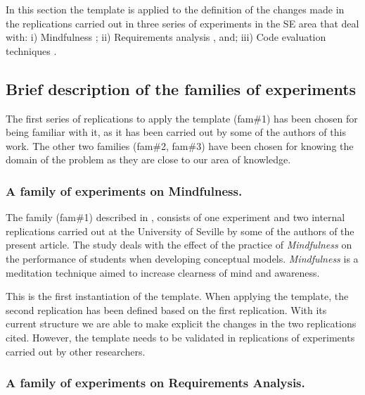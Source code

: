 % 
%
%
In this section the template is applied to the definition of the changes made in the replications carried out in three series of experiments in the SE area that deal with: i) Mindfulness \cite{bernardez-jss-2016}; ii) Requirements analysis \cite{aranda2016estudio}, and; iii) Code evaluation techniques \cite{juristo2012comparing,juristo2003functional,juristo2013process}.

%
%
\subsection{Brief description of the families of experiments}
\label{sec:brief}
The first series of replications to apply the template (fam\#1) has been chosen for being familiar with it, as it has been carried out by some of the authors of this work. The other two families (fam\#2, fam\#3) have been chosen for knowing the domain of the problem as they are close to our area of knowledge.
\subsubsection{A family of experiments on Mindfulness.}

The family (fam\#1) described in \cite{bernardez2014controlled,bernardez-jss-2016}, consists of one experiment and two internal replications carried out at the University of Seville by some of the authors of the present article. The study deals with the effect of the practice of \emph{Mindfulness} on the performance of students when developing conceptual models. \emph{Mindfulness} is a meditation technique aimed to increase clearness of mind and awareness.
%

This is the first instantiation of the template. When applying the template, the second replication has been defined based on the first replication. With its current structure we are able to make explicit the changes in the two replications cited. However, the template needs to be validated in replications of experiments carried out by other researchers.

\subsubsection{A family of experiments on Requirements Analysis.}

